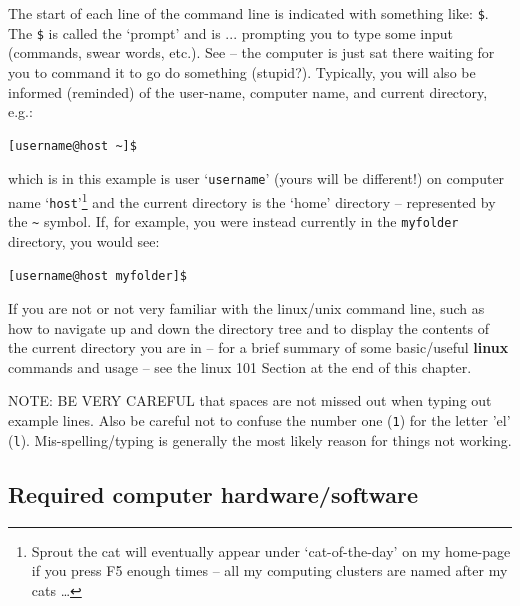 The start of each line of the command line is indicated with something like: \texttt{\$}. The \texttt{\$} is called the ‘prompt’ and is ... prompting you to type some input (commands, swear words, etc.). See – the computer is just sat there waiting for you to command it to go do something (stupid?). Typically, you will also be informed (reminded) of the user-name, computer name, and current directory, e.g.:

\vspace{-2mm}\begin{verbatim}
[username@host ~]$
\end{verbatim}\vspace{-2mm}

\noindent which is in this example is user ‘\texttt{username}’ (yours will be different!) on computer name ‘\texttt{host}’\footnote{Sprout the cat will eventually appear under ‘cat-of-the-day’ on my home-page if you press \textsf{F5} enough times – all my computing clusters are named after my cats …} and the current directory is the ‘home’ directory -- represented by the \texttt{\~} symbol. If, for example, you were instead currently in the \texttt{myfolder} directory, you would see:

\vspace{-2mm}\begin{verbatim}
[username@host myfolder]$
\end{verbatim}\vspace{-2mm}

If you are not or not very familiar with the linux/unix command line, such as how to navigate up and down the directory tree and to display the contents of the current directory you are in – for a brief summary of some basic/useful \textbf{linux} commands and usage -- see the linux 101 Section at the end of this chapter.

NOTE: BE VERY CAREFUL that spaces are not missed out when typing out example lines. Also be careful not to confuse the number one (\texttt{1}) for the letter 'el' (\texttt{l}). Mis-spelling/typing is generally the most likely reason for things not working.

\newpage

\subsection*{Required computer hardware/software}

